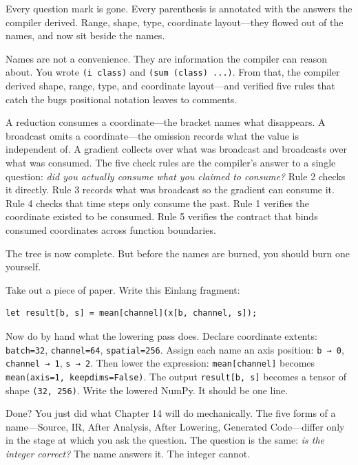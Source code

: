 \documentclass[11pt,titlepage]{article}
\begin{document}
Every question mark is gone. Every parenthesis is annotated with the
answers the compiler derived. Range, shape, type, coordinate
layout---they flowed out of the names, and now sit beside the names.

\vspace{2em}

Names are not a convenience. They are information the compiler can
reason about. You wrote \texttt{(i\ class)} and
\texttt{(sum\ (class)\ ...)}. From that, the compiler derived shape,
range, type, and coordinate layout---and verified five rules that catch
the bugs positional notation leaves to comments.

A reduction consumes a coordinate---the bracket names what disappears. A
broadcast omits a coordinate---the omission records what the value is
independent of. A gradient collects over what was broadcast and
broadcasts over what was consumed. The five check rules are the
compiler's answer to a single question: \emph{did you actually consume
what you claimed to consume?} Rule 2 checks it directly. Rule 3 records
what was broadcast so the gradient can consume it. Rule 4 checks that
time steps only consume the past. Rule 1 verifies the coordinate existed
to be consumed. Rule 5 verifies the contract that binds consumed
coordinates across function boundaries.

The tree is now complete. But before the names are burned, you should
burn one yourself.

Take out a piece of paper. Write this Einlang fragment:

\begin{verbatim}
let result[b, s] = mean[channel](x[b, channel, s]);
\end{verbatim}

Now do by hand what the lowering pass does. Declare coordinate extents:
\texttt{batch=32}, \texttt{channel=64}, \texttt{spatial=256}. Assign
each name an axis position: \texttt{b\ →\ 0}, \texttt{channel\ →\ 1},
\texttt{s\ →\ 2}. Then lower the expression: \texttt{mean{[}channel{]}}
becomes \texttt{mean(axis=1,\ keepdims=False)}. The output
\texttt{result{[}b,\ s{]}} becomes a tensor of shape
\texttt{(32,\ 256)}. Write the lowered NumPy. It should be one line.

Done? You just did what Chapter 14 will do mechanically. The five forms
of a name---Source, IR, After Analysis, After Lowering, Generated
Code---differ only in the stage at which you ask the question. The
question is the same: \emph{is the integer correct?} The name answers
it. The integer cannot.
\end{document}
